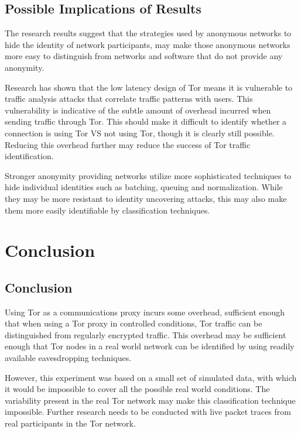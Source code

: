 \section{Possible Implications of Results}

The research results suggest that the strategies used by anonymous networks to
hide the identity of network participants, may make those anonymous networks
more easy to distinguish from networks and software that do not provide any
anonymity.

Research has shown that the low latency design of Tor means it is vulnerable to
traffic analysis attacks that correlate traffic patterns with users. This
vulnerability is indicative of the subtle amount of overhead incurred when
sending traffic through Tor. This should make it difficult to identify whether a
connection is using Tor VS not using Tor, though it is clearly still possible.
Reducing this overhead further may reduce the success of Tor traffic
identification.

Stronger anonymity providing networks utilize more sophisticated techniques to
hide individual identities such as batching, queuing and normalization. While
they may be more resistant to identity uncovering attacks, this may also make
them more easily identifiable by classification techniques.


\chapter{Conclusion}

\section{Conclusion}

Using Tor as a communications proxy incurs some overhead, sufficient enough that
when using a Tor proxy in controlled conditions, Tor traffic can be
distinguished from regularly encrypted traffic. This overhead may be sufficient
enough that Tor nodes in a real world network can be identified by using readily
available eavesdropping techniques.

However, this experiment was based on a small set of simulated data, with which
it would be impossible to cover all the possible real world conditions. The
variability present in the real Tor network may make this classification
technique impossible. Further research needs to be conducted with live packet
traces from real participants in the Tor network.

